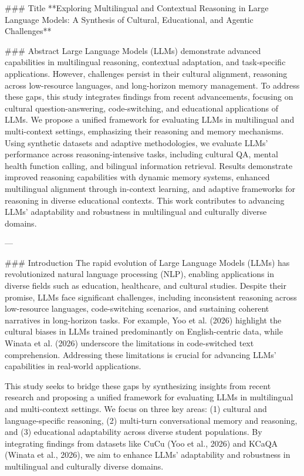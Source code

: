 ### Title
**Exploring Multilingual and Contextual Reasoning in Large Language Models: A Synthesis of Cultural, Educational, and Agentic Challenges**

### Abstract
Large Language Models (LLMs) demonstrate advanced capabilities in multilingual reasoning, contextual adaptation, and task-specific applications. However, challenges persist in their cultural alignment, reasoning across low-resource languages, and long-horizon memory management. To address these gaps, this study integrates findings from recent advancements, focusing on cultural question-answering, code-switching, and educational applications of LLMs. We propose a unified framework for evaluating LLMs in multilingual and multi-context settings, emphasizing their reasoning and memory mechanisms. Using synthetic datasets and adaptive methodologies, we evaluate LLMs' performance across reasoning-intensive tasks, including cultural QA, mental health function calling, and bilingual information retrieval. Results demonstrate improved reasoning capabilities with dynamic memory systems, enhanced multilingual alignment through in-context learning, and adaptive frameworks for reasoning in diverse educational contexts. This work contributes to advancing LLMs' adaptability and robustness in multilingual and culturally diverse domains.

---

### Introduction
The rapid evolution of Large Language Models (LLMs) has revolutionized natural language processing (NLP), enabling applications in diverse fields such as education, healthcare, and cultural studies. Despite their promise, LLMs face significant challenges, including inconsistent reasoning across low-resource languages, code-switching scenarios, and sustaining coherent narratives in long-horizon tasks. For example, Yoo et al. (2026) highlight the cultural biases in LLMs trained predominantly on English-centric data, while Winata et al. (2026) underscore the limitations in code-switched text comprehension. Addressing these limitations is crucial for advancing LLMs' capabilities in real-world applications.

This study seeks to bridge these gaps by synthesizing insights from recent research and proposing a unified framework for evaluating LLMs in multilingual and multi-context settings. We focus on three key areas: (1) cultural and language-specific reasoning, (2) multi-turn conversational memory and reasoning, and (3) educational adaptability across diverse student populations. By integrating findings from datasets like CuCu (Yoo et al., 2026) and KCaQA (Winata et al., 2026), we aim to enhance LLMs' adaptability and robustness in multilingual and culturally diverse domains.

